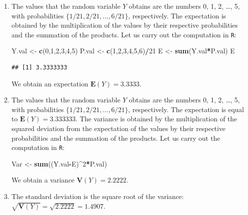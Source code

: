 \documentclass[]{krantz}
\makeatletter
\newenvironment{Shaded}{\begin{snugshade}}{\end{snugshade}}
\newcommand{\DecValTok}[1]{\textcolor[rgb]{0.00,0.00,0.81}{#1}}
\newcommand{\KeywordTok}[1]{\textcolor[rgb]{0.13,0.29,0.53}{\textbf{#1}}}
\newcommand{\NormalTok}[1]{#1}
\newcommand{\OperatorTok}[1]{\textcolor[rgb]{0.81,0.36,0.00}{\textbf{#1}}}
\newcommand{\StringTok}[1]{\textcolor[rgb]{0.31,0.60,0.02}{#1}}
\newcommand{\Expec}{\mathbf{E}}
\newcommand{\Var}{\mathbf{V}}
\newenvironment{kframe}{%
\medskip{}
\setlength{\fboxsep}{.8em}
 \def\at@end@of@kframe{}%
 \ifinner\ifhmode%
  \def\at@end@of@kframe{\end{minipage}}%
  \begin{minipage}{\columnwidth}%
 \fi\fi%
 \def\FrameCommand##1{\hskip\@totalleftmargin \hskip-\fboxsep
 \colorbox{shadecolor}{##1}\hskip-\fboxsep
     \hskip-\linewidth \hskip-\@totalleftmargin \hskip\columnwidth}%
 \MakeFramed {\advance\hsize-\width
   \@totalleftmargin\z@ \linewidth\hsize
   \@setminipage}}%
 {\par\unskip\endMakeFramed%
 \at@end@of@kframe}
\renewenvironment{Shaded}{\begin{kframe}}{\end{kframe}}
\theoremstyle{definition}
\theoremstyle{definition}
\theoremstyle{definition}
\theoremstyle{remark}
\makeatother
\begin{document}
\begin{enumerate}
\def\labelenumi{\arabic{enumi}.}
\setcounter{enumi}{5}
\item
  The values that the random
  variable \(Y\) obtains are the numbers 0, 1, 2, \ldots{}, 5, with probabilities
  \(\{1/21, 2/21, \ldots, 6/21\}\), respectively. The expectation is
  obtained by the multiplication of the values by their respective
  probabilities and the summation of the products. Let us carry out the
  computation in \texttt{R}:

\begin{Shaded}
\begin{Highlighting}[]
\NormalTok{Y.val <-}\StringTok{ }\KeywordTok{c}\NormalTok{(}\DecValTok{0}\NormalTok{,}\DecValTok{1}\NormalTok{,}\DecValTok{2}\NormalTok{,}\DecValTok{3}\NormalTok{,}\DecValTok{4}\NormalTok{,}\DecValTok{5}\NormalTok{)}
\NormalTok{P.val <-}\StringTok{ }\KeywordTok{c}\NormalTok{(}\DecValTok{1}\NormalTok{,}\DecValTok{2}\NormalTok{,}\DecValTok{3}\NormalTok{,}\DecValTok{4}\NormalTok{,}\DecValTok{5}\NormalTok{,}\DecValTok{6}\NormalTok{)}\OperatorTok{/}\DecValTok{21}
\NormalTok{E <-}\StringTok{ }\KeywordTok{sum}\NormalTok{(Y.val}\OperatorTok{*}\NormalTok{P.val)}
\NormalTok{E}
\end{Highlighting}
\end{Shaded}

\begin{verbatim}
## [1] 3.3333333
\end{verbatim}

  We obtain an expectation \(\Expec(Y) = 3.3333\).
\item
  The values that the random
  variable \(Y\) obtains are the numbers 0, 1, 2, \ldots{}, 5, with probabilities
  \(\{1/21, 2/21, \ldots, 6/21\}\), respectively. The expectation is equal
  to \(\Expec(Y) = 3.333333\). The variance is obtained by the
  multiplication of the squared deviation from the expectation of the
  values by their respective probabilities and the summation of the
  products. Let us carry out the computation in \texttt{R}:

\begin{Shaded}
\begin{Highlighting}[]
\NormalTok{Var <-}\StringTok{ }\KeywordTok{sum}\NormalTok{((Y.val}\OperatorTok{-}\NormalTok{E)}\OperatorTok{^}\DecValTok{2}\OperatorTok{*}\NormalTok{P.val)}
\end{Highlighting}
\end{Shaded}

  We obtain a variance \(\Var(Y) = 2.2222\).
\item
  The standard deviation is the
  square root of the variance: \(\sqrt{\Var(Y)} = \sqrt{2.2222} = 1.4907\).
\end{enumerate}
\end{document}
